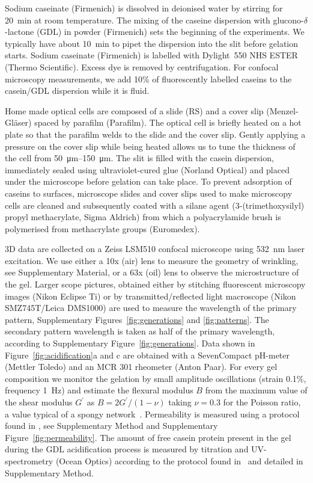 \documentclass[twocolumn,superscriptaddress,showpacs,preprintnumbers,
amsmath,amssymb,prl]{revtex4-1}
\begin{document}
Sodium caseinate (Firmenich) is dissolved in deionised water by stirring for \SI{20}{\minute} at room temperature. The mixing of the caseine dispersion with glucono-$\delta$-lactone (GDL) in powder (Firmenich) sets the beginning of the experiments. We typically have about \SI{10}{\minute} to pipet the dispersion into the slit before gelation starts. Sodium caseinate (Firmenich) is labelled with Dylight~550 NHS ESTER (Thermo Scientific). Excess dye is removed by centrifugation. For confocal microscopy measurements, we add 10\% of fluorescently labelled caseins to the casein/GDL dispersion while it is fluid.

Home made optical cells are composed of a slide (RS) and a cover slip (Menzel-Gl\"aser) spaced by parafilm (Parafilm). The optical cell is briefly heated on a hot plate so that the parafilm welds to the slide and the cover slip. Gently applying a pressure on the cover slip while being heated allows us to tune the thickness of the cell from \SIrange{50}{150}{\micro\metre}. The slit is filled with the casein dispersion, immediately sealed using ultraviolet-cured glue (Norland Optical) and placed under the microscope before gelation can take place. To prevent adsorption of caseins to surfaces, microscope slides and cover slips used to make microscopy cells are cleaned and subsequently coated with a silane agent (3-(trimethoxysilyl) propyl methacrylate, Sigma Aldrich) from which a polyacrylamide brush is polymerised from methacrylate groups (Euromedex).

3D data are collected on a Zeiss LSM510 confocal microscope using \SI{532}{\nano\meter} laser excitation. We use either a 10x (air) lens to measure the geometry of wrinkling, see Supplementary Material, or a 63x (oil) lens to observe the microstructure of the gel. Larger scope pictures, obtained either by stitching fluorescent microscopy images (Nikon Eclipse Ti) or by transmitted/reflected light macroscope (Nikon SMZ745T/Leica DMS1000) are used to measure the wavelength of the primary pattern, Supplementary Figures~\ref{fig:generations} and \ref{fig:patterns}. The secondary pattern wavelength is taken as half of the primary wavelength, according to Supplementary Figure~\ref{fig:generations}.
Data shown in Figure~\ref{fig:acidification}a and c are obtained with a SevenCompact pH-meter (Mettler Toledo) and an MCR 301 rheometer (Anton Paar). For every gel composition we monitor the gelation by small amplitude oscillations (strain 0.1\%, frequency \SI{1}{\hertz}) and estimate the flexural modulus $B$ from the maximum value of the shear modulus $G^\prime$ as $B=2G^\prime/(1-\nu)$ taking $\nu=0.3$ for the Poisson ratio, a value typical of a spongy network~\cite{Greaves2011}.
Permeability is measured using a protocol found in \cite{VanDijk1986}, see Supplementary Method and Supplementary Figure~\ref{fig:permeability}. The amount of free casein protein present in the gel during the GDL acidification process is measured by titration and UV-spectrometry (Ocean Optics) according to the protocol found in~\cite{Roefs1986} and detailed in Supplementary Method.
\end{document}

